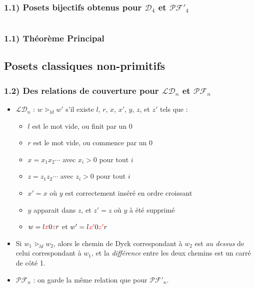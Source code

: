 \documentclass{beamer}
\begin{document}
\begin{frame}
    \frametitle{1.1) Posets \textbf{bijectifs} obtenus pour $\mathcal{D}_4$
        et $\mathcal{PF'}_4$}
    \begin{columns}
        \begin{column}{0.4\textwidth}
            \begin{center}
                
            \end{center}
        \end{column}
        \begin{column}{0.6\textwidth}
            \begin{center}
                
            \end{center}
        \end{column}
    \end{columns}
\end{frame}

\begin{frame}
    \frametitle{1.1) Théorème Principal}
\end{frame}

\subsection{Posets classiques non-primitifs}

\begin{frame}
    \frametitle{1.2) Des relations de couverture pour $\mathcal{LD}_n$ et
        $\mathcal{PF}_n$}
    \begin{itemize}
        \item $\mathcal{LD}_n$ : $w \gtrdot_{ld} w'$ s'il existe $l$, $r$,
             $x$, $x'$, $y$, $z$, et $z'$ tels que :
        \begin{itemize}
            \item $l$ est le mot vide, ou finit par un $0$
            \item $r$ est le mot vide, ou commence par un $0$
            \item $x = x_1x_2 \cdots$ avec $x_i > 0$ pour tout $i$
            \item $z = z_1z_2 \cdots$ avec $z_i > 0$ pour tout $i$
            \item $x' = x$ où $y$ est correctement inséré en ordre croissant
            \item $y$ apparait dans $z$, et $z' = z$ où $y$ à été supprimé
            \item $w = l\color{red}x\color{black}0\color{red}z\color{black}
                r$ et $w' = l\color{red}x'\color{black}0\color{red}z'
                \color{black}r$
        \end{itemize}
        \item  Si $w_1 \gtrdot_{ld} w_2$, alors le chemin de Dyck correspondant
        à $w_2$ est \emph{au dessus} de celui correspondant à $w_1$, et la
        \emph{différence} entre les deux chemins est un carré de côté 1.
        \item $\mathcal{PF}_n$ : on garde la même relation que pour
            $\mathcal{PF'}_n$.
    \end{itemize}
\end{frame}
\end{document}
